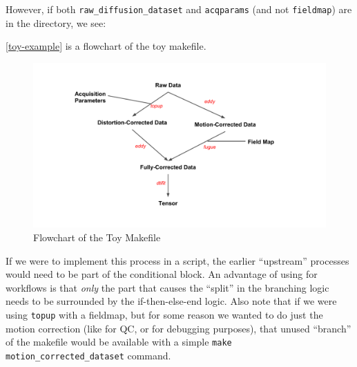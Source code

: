 


However, if both \texttt{raw_diffusion_dataset} and \texttt{acqparams} (and not \texttt{fieldmap}) are in the directory, we see:


\autoref{toy-example} is a flowchart of the toy makefile.

\begin{figure}
	\begin{center}  %
		\includegraphics[width=\textwidth]{images/distcorr-flowchart.pdf}
	\end{center}
	\caption{Flowchart of the Toy Makefile}
	\label{toy-example}
\end{figure}


If we were to implement this process in a \bashn{} script, the earlier
``upstream'' processes would need to be part of the conditional
block. An advantage of using \maken{} for workflows is that
\emph{only} the part that causes the ``split'' in the branching logic
needs to be surrounded by the if-then-else-end logic. Also note that
if we were using \texttt{topup} with a fieldmap, but for some reason
we wanted to do just the motion correction (like for QC, or for
debugging purposes), that unused ``branch'' of the makefile would be
available with a simple \texttt{make motion_corrected_dataset}
command. \newpage



